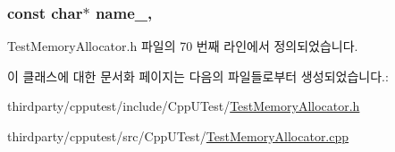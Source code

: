 \subsubsection[{\texorpdfstring{name\+\_\+}{name_}}]{\setlength{\rightskip}{0pt plus 5cm}const char$\ast$ name\+\_\+\hspace{0.3cm}{\ttfamily [protected]}, {\ttfamily [inherited]}}\hypertarget{class_test_memory_allocator_a7dac8366c11fbcad2f49d85fe8fc4fbe}{}\label{class_test_memory_allocator_a7dac8366c11fbcad2f49d85fe8fc4fbe}


Test\+Memory\+Allocator.\+h 파일의 70 번째 라인에서 정의되었습니다.



이 클래스에 대한 문서화 페이지는 다음의 파일들로부터 생성되었습니다.\+:\begin{DoxyCompactItemize}
\item 
thirdparty/cpputest/include/\+Cpp\+U\+Test/\hyperlink{_test_memory_allocator_8h}{Test\+Memory\+Allocator.\+h}\item 
thirdparty/cpputest/src/\+Cpp\+U\+Test/\hyperlink{_test_memory_allocator_8cpp}{Test\+Memory\+Allocator.\+cpp}\end{DoxyCompactItemize}
